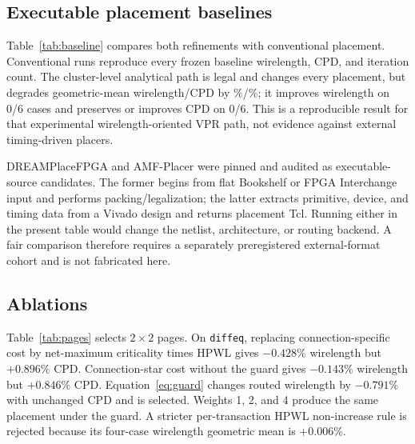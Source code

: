 \documentclass[sigconf,anonymous,review]{acmart}
\newcommand{\vpr}{\textsc{VPR}}
\newcommand{\hpwl}{\textsc{HPWL}}
\begin{document}
\subsection{Executable placement baselines}

\begin{table}[t]
\centering
\scriptsize
\caption{Routed change (\%) versus conventional \vpr{} placement on identical
packed netlists and router settings.}
\label{tab:baseline}
\resizebox{\columnwidth}{!}{}
\end{table}

Table~\ref{tab:baseline} compares both refinements with conventional
placement.  Conventional runs reproduce every frozen baseline wirelength, CPD,
and iteration count.  The cluster-level analytical path is legal and changes
every placement, but degrades geometric-mean wirelength/CPD by
\ApWlGeo\%/\ApCpdGeo\%; it improves wirelength on 0/6 cases and preserves or
improves CPD on 0/6.  This is a reproducible result for that experimental
wirelength-oriented \vpr{} path, not evidence against external timing-driven
placers.

DREAMPlaceFPGA and AMF-Placer were pinned and audited as executable-source
candidates.  The former begins from flat Bookshelf or FPGA Interchange input
and performs packing/legalization; the latter extracts primitive, device, and
timing data from a Vivado design and returns placement Tcl.  Running either in
the present table would change the netlist, architecture, or routing backend.
A fair comparison therefore requires a separately preregistered external-format
cohort and is not fabricated here.

\subsection{Ablations}

\begin{table}[t]
\centering
\small
\caption{Page-size selection on the four-case development cohort.  Bold is
selected by minimum routed-wirelength geometric mean.}
\label{tab:pages}

\end{table}

Table~\ref{tab:pages} selects $2\times2$ pages.  On \texttt{diffeq}, replacing
connection-specific cost by net-maximum criticality times \hpwl{} gives
$-0.428\%$ wirelength but $+0.896\%$ CPD.  Connection-star cost without the
guard gives $-0.143\%$ wirelength but $+0.846\%$ CPD.  Equation~\ref{eq:guard}
changes routed wirelength by $-0.791\%$ with unchanged CPD and is selected.
Weights 1, 2, and 4 produce the same placement under the guard.  A stricter
per-transaction \hpwl{} non-increase rule is rejected because its four-case
wirelength geometric mean is $+0.006\%$.
\end{document}
